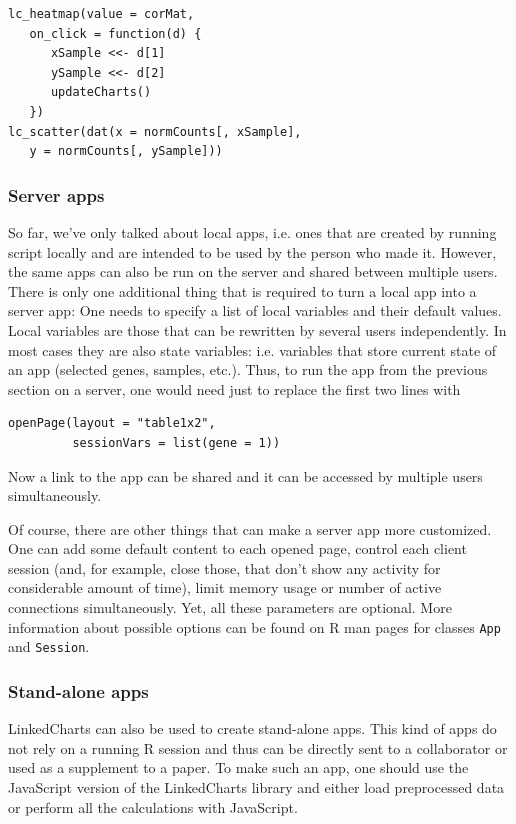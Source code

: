 \documentclass[twocolumn,10pt]{article}
\begin{document}
\begin{verbatim}
lc_heatmap(value = corMat,
   on_click = function(d) {
      xSample <<- d[1]
      ySample <<- d[2]
      updateCharts()
   })
lc_scatter(dat(x = normCounts[, xSample], 
   y = normCounts[, ySample]))
\end{verbatim}

\subsubsection{Server apps}

So far, we've only talked about local apps, i.e. ones that are created by running script locally and are intended to be used by the person who made it. However, the same apps can also be run on the server and shared between multiple users. There is only one additional thing that is required to turn a local app into a server app: One needs to specify a list of local variables and their default values. Local variables are those that can be rewritten by several users independently. In most cases they are also state variables: i.e. variables that store current state of an app (selected genes, samples, etc.). Thus, to run the app from the previous section on a server, one would need just to replace the first two lines with

\begin{verbatim}
openPage(layout = "table1x2", 
         sessionVars = list(gene = 1))
\end{verbatim}

Now a link to the app can be shared and it can be accessed by multiple users simultaneously.

Of course, there are other things that can make a server app more customized. One can add some default content to each opened page, control each client session (and, for example, close those, that don't show any activity for considerable amount of time), limit memory usage or number of active connections simultaneously. Yet, all these parameters are optional. More information about possible options can be found on R man pages for classes \texttt{App} and \texttt{Session}.

\subsubsection{Stand-alone apps}

LinkedCharts can also be used to create stand-alone apps. This kind of apps do not rely on a running R session and thus can be directly sent to a collaborator or used as a supplement to a paper. To make such an app, one should use the JavaScript version of the LinkedCharts library and either load preprocessed data or perform all the calculations with JavaScript. 
\end{document}
